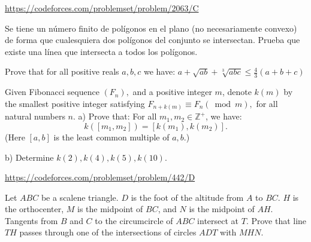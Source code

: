 \documentclass[11pt]{scrartcl}
\begin{document}
\begin{problem}[CF 2063C]
\url{https://codeforces.com/problemset/problem/2063/C}
\end{problem}
\begin{problem}
Se tiene un número finito de polígonos en el plano (no necesariamente convexo) de forma que cualesquiera dos polígonos del conjunto se intersectan. Prueba que existe una línea que intersecta a todos los polígonos.
\end{problem}
\begin{problem}
Prove that for all positive reals $a, b,c$ we have: $a +\sqrt{ab}+ \sqrt[3]{abc}\le \frac43 (a + b + c)$
\end{problem}
\begin{problem}
Given Fibonacci sequence $(F_n),$ and a positive integer $m$, denote $k(m)$ by the smallest positive integer satisfying $F_{n+k(m)}\equiv F_n(\bmod m),$ for all natural numbers $n$.
a) Prove that: For all $m_1,m_2\in \mathbb{Z^+}$, we have:$$k([m_1,m_2])=[k(m_1),k(m_2)].$$(Here $[a,b]$ is the least common multiple of $a,b.$)

b) Determine $k(2),k(4),k(5),k(10).$
\end{problem}
\begin{problem}[CF 442D]
\url{https://codeforces.com/problemset/problem/442/D}
\end{problem}
\begin{problem}[GMO 2024/3]
	Let $ABC$ be a scalene triangle. $D$ is the foot of the altitude from $A$ to $BC$. $H$ is the orthocenter, $M$ is the midpoint of $BC$, and $N$ is the midpoint of $AH$. Tangents from $B$ and $C$ to the circumcircle of $ABC$ intersect at $T$. Prove that line $TH$ passes through one of the intersections of circles $ADT$ with $MHN$.
\end{problem}
\end{document}
